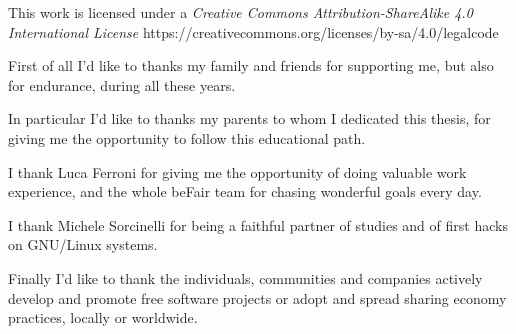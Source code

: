 \documentclass[a4paper,oneside,11pt]{report}
\begin{document}

\copertinatesi
{}
\indice
\indicefigure
\indicetabelle
\iniziatesto

This work is licensed under a \textit{Creative Commons Attribution-ShareAlike 4.0 International License} https://creativecommons.org/licenses/by-sa/4.0/legalcode









\appendix




\ringraziamenti
First of all I'd like to thanks my family and friends for supporting me, but also for endurance, during all these years.

In particular I'd like to thanks my parents to whom I dedicated this thesis, for giving me the opportunity to follow this educational path.

I thank Luca Ferroni for giving me the opportunity of doing valuable work experience, and the whole beFair team for chasing wonderful goals every day.

I thank Michele Sorcinelli for being a faithful partner of studies and of first hacks on GNU/Linux systems.

Finally I'd like to thank the individuals, communities and companies actively develop and promote free software projects or adopt and spread sharing economy practices, locally or worldwide.
\end{document}
